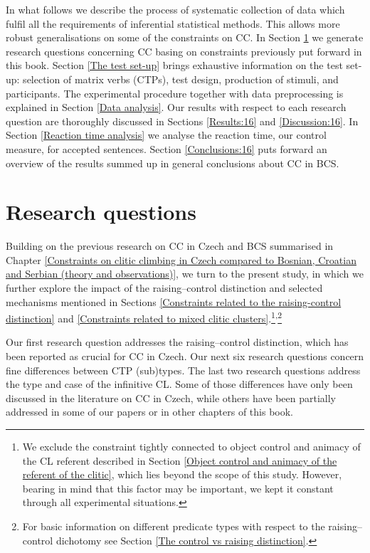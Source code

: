 In what follows we describe the process of systematic collection of data which fulfil all the requirements of inferential statistical methods. This allows more robust generalisations on some of the constraints on CC. In Section \ref{RQ:16} we generate research questions concerning CC basing on constraints previously put forward in this book. Section \ref{The test set-up} brings exhaustive information on the test set-up: selection of matrix verbs (CTPs), test design, production of stimuli, and participants. The experimental procedure together with data preprocessing is explained in Section \ref{Data analysis}. Our results with respect to each research question are thoroughly discussed in Sections \ref{Results:16} and \ref{Discussion:16}. In Section \ref{Reaction time analysis} we analyse the reaction time, our control measure, for accepted sentences. Section \ref{Conclusions:16} puts forward an overview of the results summed up in general conclusions about CC in BCS.

\largerpage
\section{Research questions}
\label{RQ:16}

Building on the previous research on CC in Czech and BCS summarised in Chapter \ref{Constraints on clitic climbing in Czech compared to Bosnian, Croatian and Serbian (theory and observations)}, we turn to the present study, in which we further explore the impact of the raising--control distinction and selected mechanisms mentioned in Sections \ref{Constraints related to the raising-control distinction} and \ref{Constraints related to mixed clitic clusters}.\footnote{We exclude the constraint tightly connected to object control and animacy of the CL referent described in Section \ref{Object control and animacy of the referent of the clitic}, which lies beyond the scope of this study. However, bearing in mind that this factor may be important, we kept it constant through all experimental situations.}\textsuperscript{,}\footnote{For basic information on different predicate types with respect to the raising--control dichotomy see Section \ref{The control vs raising distinction}.}

Our first research question addresses the raising--control distinction, which has been reported as crucial for CC in Czech. Our next six research questions concern fine differences between CTP (sub)types. The last two research questions address the type and case of the infinitive CL. Some of those differences have only been discussed in the literature on CC in Czech, while others have been partially addressed in some of our papers or in other chapters of this book. 

